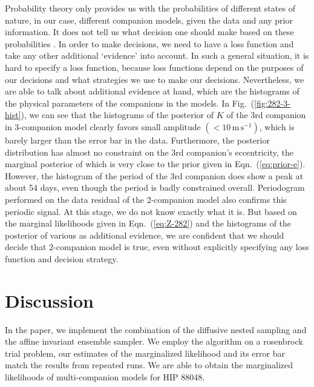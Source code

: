 \documentclass[letterpaper, preprint]{aastex}
\newcommand{\unit}[1]{\mathrm{#1}}
\begin{document}
Probability theory only provides us with the probabilities of different states of nature, in our case, different companion models, given the data and any prior information. It does not tell us what decision one should make based on these probabilities \citep{jaynes03a}. In order to make decisions, we need to have a loss function and take any other additional `evidence' into account. In such a general situation, it is hard to specify a loss function, because loss functions depend on the purposes of our decisions and what strategies we use to make our decisions. Nevertheless, we are able to talk about additional evidence at hand, which are the histograms of the physical parameters of the companions in the models. In Fig.~(\ref{fig:282-3-hist}), we can see that the histograms of the posterior of $K$ of the 3rd companion in 3-companion model clearly favors small amplitude $(<10\,\unit{m\,s^{-1}})$, which is barely larger than the error bar in the data. Furthermore, the posterior distribution has almost no constraint on the 3rd companion's eccentricity, the marginal posterior of which is very close to the prior given in Eqn.~(\ref{eq:prior-e}). However, the histogram of the period of the 3rd companion does show a peak at about 54 days, even though the period is badly constrained overall. Periodogram performed on the data residual of the 2-companion model also confirms this periodic signal. At this stage, we do not know exactly what it is. But based on the marginal likelihoods given in Eqn.~(\ref{eq:Z-282}) and the histograms of the posterior of various  as  additional evidence, we are confident that we should decide that 2-companion model is true, even without explicitly specifying any loss function and decision strategy.


\section{Discussion}
\label{sec:discussion}
In the paper, we implement the combination of the diffusive nested sampling and the affine invariant ensemble sampler. We employ the algorithm on a rosenbrock trial problem, our estimates of the marginalized likelihood and its error bar match the results from repeated runs. We are able to obtain the marginalized likelihoods of multi-companion models for HIP 88048.
\end{document}
